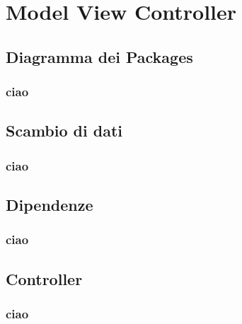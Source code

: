 \section{Model View Controller}

\subsection{Diagramma dei Packages}
\begin{frame}
    \frametitle{ciao}
\end{frame}

\subsection{Scambio di dati}
\begin{frame}
    \frametitle{ciao}
\end{frame}

\subsection{Dipendenze}
\begin{frame}
    \frametitle{ciao}
\end{frame}

\subsection{Controller}
\begin{frame}
    \frametitle{ciao}
\end{frame}